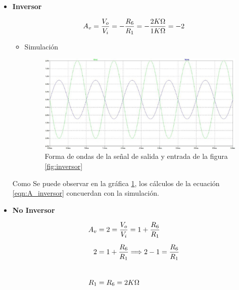 \begin{enumerate}[label=\textbf{\arabic*.}, font=\bfseries]
    \begin{itemize}
        \item \textbf{Inversor}

            \begin{equation}
                A_v=\dfrac{V_o}{V_i}=-\dfrac{R_6}{R_1}=-\dfrac{2K\ohm}{1K\ohm} = -2
                \label{eqn:A_inversor}
            \end{equation}

            \begin{itemize}
\newpage            
                \item Simulación

                    \begin{figure}[H]
                      \centering
                      \renewcommand{\figurename}{Gráfica}
                        \setcounter{figure}{0}
                      \includegraphics[width=\textwidth]{Imagenes/inversor.png}
                      \caption{Forma de ondas de la señal de salida y entrada de la figura \ref{fig:inversor}}
                      \label{fig:sim_inversor}
                    \end{figure}
            \end{itemize}

            Como Se puede observar en la gráfica \ref{fig:sim_inversor}, los cálculos de la ecuación \ref{eqn:A_inversor} concuerdan con la simulación.

        \item \textbf{No Inversor}

            \begin{align}
                A_v&=2=\dfrac{V_o}{V_i}=1+\dfrac{R_6}{R_1} \nonumber \\[0.2cm]
                2&=1+\dfrac{R_6}{R_1} \Longrightarrow 2-1=\dfrac{R_6}{R_1} \nonumber \\[0.8cm]
                R_1&=R_6=2K\ohm                     
                \label{eqn:A_no_inversor}
            \end{align}


\end{itemize}
\end{enumerate}
